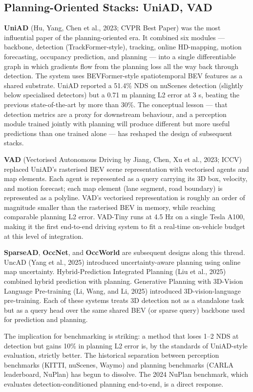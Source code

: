 \subsection{Planning-Oriented Stacks: UniAD, VAD}\label{planning-oriented-stacks-uniad-vad}

\textbf{UniAD} (Hu, Yang, Chen et al., 2023; CVPR Best Paper) was the most influential paper of the planning-oriented era. It combined six modules --- backbone, detection (TrackFormer-style), tracking, online HD-mapping, motion forecasting, occupancy prediction, and planning --- into a single differentiable graph in which gradients flow from the planning loss all the way back through detection. The system uses BEVFormer-style spatiotemporal BEV features as a shared substrate. UniAD reported a 51.4\% NDS on nuScenes detection (slightly below specialised detectors) but a 0.71 m planning L2 error at 3 s, beating the previous state-of-the-art by more than 30\%. The conceptual lesson --- that detection metrics are a proxy for downstream behaviour, and a perception module trained jointly with planning will produce different but more useful predictions than one trained alone --- has reshaped the design of subsequent stacks.

\textbf{VAD} (Vectorised Autonomous Driving by Jiang, Chen, Xu et al., 2023; ICCV) replaced UniAD's rasterised BEV scene representation with vectorised agents and map elements. Each agent is represented as a query carrying its 3D box, velocity, and motion forecast; each map element (lane segment, road boundary) is represented as a polyline. VAD's vectorised representation is roughly an order of magnitude smaller than the rasterised BEV in memory, while reaching comparable planning L2 error. VAD-Tiny runs at 4.5 Hz on a single Tesla A100, making it the first end-to-end driving system to fit a real-time on-vehicle budget at this level of integration.

\textbf{SparseAD}, \textbf{OccNet}, and \textbf{OccWorld} are subsequent designs along this thread. UncAD (Yang et al., 2025) introduced uncertainty-aware planning using online map uncertainty. Hybrid-Prediction Integrated Planning (Liu et al., 2025) combined hybrid prediction with planning. Generative Planning with 3D-Vision Language Pre-training (Li, Wang, and Li, 2025) introduced 3D-vision-language pre-training. Each of these systems treats 3D detection not as a standalone task but as a query head over the same shared BEV (or sparse query) backbone used for prediction and planning.

The implication for benchmarking is striking: a method that loses 1--2 NDS at detection but gains 10\% in planning L2 error is, by the standards of UniAD-style evaluation, strictly better. The historical separation between perception benchmarks (KITTI, nuScenes, Waymo) and planning benchmarks (CARLA leaderboard, NuPlan) has begun to dissolve. The 2024 NuPlan benchmark, which evaluates detection-conditioned planning end-to-end, is a direct response.


